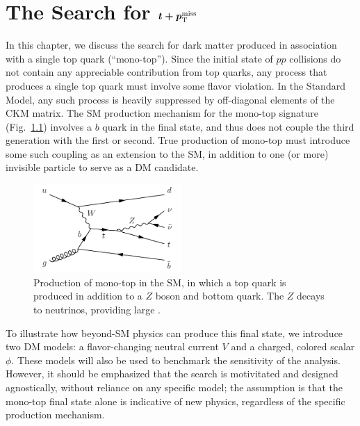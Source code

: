 \chapter{The Search for $\boldmath{t+p_\text{T}^\text{miss}}$}
\label{sec:mt}

In this chapter, we discuss the search for dark matter produced in association with a single top quark (``mono-top'').
Since the initial state of $pp$ collisions do not contain any appreciable contribution from top quarks, any process that produces a single top quark must involve some flavor violation.
In the Standard Model, any such process is heavily suppressed by off-diagonal elements of the CKM matrix.
The SM production mechanism for the mono-top signature (Fig.~\ref{fig:mt:tzq}) involves a $b$ quark in the final state, and thus does not couple the third generation with the first or second.
True production of mono-top must introduce some such coupling as an extension to the SM, in addition to one (or more) invisible particle to serve as a DM candidate.

\begin{figure}[!ht]
    \begin{center}
        \includegraphics[width=0.5\textwidth]{figures/monotop/diagrams/tzq.pdf}
        \caption{Production of mono-top in the SM, in which a top quark is produced in addition to a $Z$ boson and bottom quark. The $Z$ decays to neutrinos, providing large \ptmiss.}
        \label{fig:mt:tzq}
    \end{center}
\end{figure}

To illustrate how beyond-SM physics can produce this final state, we introduce two DM models: a flavor-changing neutral current $V$ and a charged, colored scalar $\phi$.
These models will also be used to benchmark the sensitivity of the analysis.
However, it should be emphasized that the search is motivitated and designed agnostically, without reliance on any specific model; the assumption is that the mono-top final state alone is indicative of new physics, regardless of the specific production mechanism.

